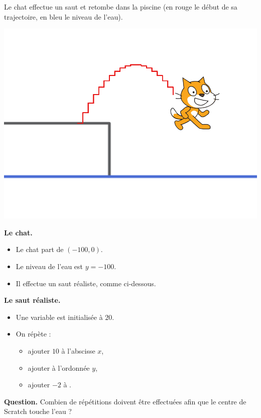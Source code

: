 \documentclass[class=report,crop=false, 12pt]{standalone}
\begin{document}
\begin{enigme}

Le chat effectue un saut et retombe dans la piscine (en rouge le début de sa trajectoire, en bleu le niveau de l'eau).

\begin{center}
  \includegraphics[scale=\scaleecran]{ecran-08-eg3} 
\end{center}


\bigskip
\textbf{Le chat.}

\begin{itemize}
  \item Le chat part de $(-100,0)$.
  \item Le niveau de l'eau est $y=-100$.
  \item Il effectue un saut réaliste, comme ci-dessous.
\end{itemize}


\bigskip
\textbf{Le saut réaliste.}

\begin{itemize}
  \item Une variable  est initialisée à $20$.
  \item On répète :
  \begin{itemize}
    \item ajouter $10$ à l'abscisse $x$,
    \item ajouter  à l'ordonnée $y$,
    \item ajouter $-2$ à .
  \end{itemize}
\end{itemize}

\bigskip

\textbf{Question.} Combien de répétitions doivent être effectuées afin que le centre de Scratch touche l'eau ?



\end{enigme}
\end{document}

